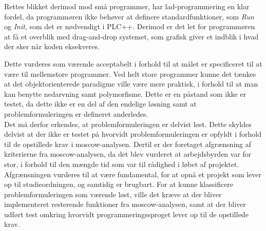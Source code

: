 \noindent Rettes blikket derimod mod små programmer, har \gls{lad}-programmering en klar fordel, da programmøren ikke behøver at definere standardfunktioner, som \textit{Run} og \textit{Init}, som det er nødvendigt i PLC++. Derimod er det let for programmøren at få et overblik med drag-and-drop systemet, som grafisk giver et indblik i hvad der sker når koden eksekveres.

Dette vurderes som værende acceptabelt i forhold til at målet er specificeret til at være til mellemstore programmer.
Ved helt store programmer kunne det tænkes at det objektorienterede paradigme ville være mere praktisk, i forhold til at man kan benytte nedarvning samt polymorfisme. Dette er en påstand som ikke er testet, da dette ikke er en del af den endelige løsning samt at problemformuleringen er defineret anderledes.\\

\noindent Det må derfor erkendes, at problemformuleringen er delvist løst.
Dette skyldes delvist at der ikke er testet på hvorvidt problemformuleringen er opfyldt i forhold til de opstillede krav i \gls{moscow}-analysen.
Dertil er der foretaget afgrænsning af kriterierne fra \gls{moscow}-analysen, da det blev vurderet at arbejdsbyrden var for stor, i forhold til den mængde tid som var til rådighed i løbet af projektet.
Afgrænsningen vurderes til at være fundamental, for at opnå et projekt som lever op til studieordningen, og samtidig er brugbart.
For at kunne klassificere problemformuleringen som værende løst, ville det kræve at der bliver implementeret resterende funktioner fra \gls{moscow}-analysen, samt at der bliver udført test omkring hvorvidt programmeringssproget lever op til de opstillede krav.